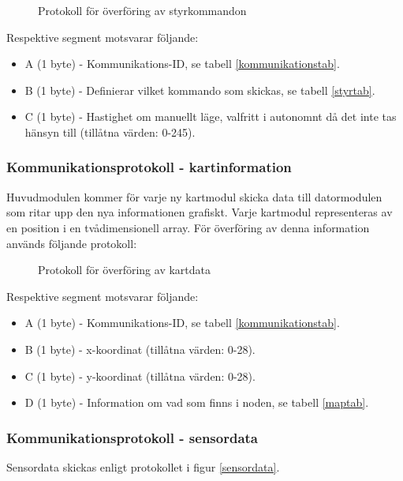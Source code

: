 \documentclass[11pt]{article}
\begin{document}
\begin{flushleft}
\begin{figure}[htbp]
\centering
\noindent\resizebox{.8\linewidth}{!}{
	}
	\caption{Protokoll för överföring av styrkommandon\label{styrdata}}	
\end{figure}

Respektive segment motsvarar följande: 
\begin{itemize}
	\item A (1 byte) - Kommunikations-ID, se tabell \ref{kommunikationstab}.
	\item B (1 byte) - Definierar vilket kommando som skickas, se tabell \ref{styrtab}.
	\item C (1 byte) - Hastighet om manuellt läge, valfritt i autonomnt då det inte tas hänsyn till (tillåtna värden: 0-245).
\end{itemize}

\subsubsection{Kommunikationsprotokoll - kartinformation}
Huvudmodulen kommer för varje ny kartmodul skicka data till datormodulen som ritar upp den nya informationen grafiskt. Varje kartmodul representeras av en position i en tvådimensionell array. För överföring av denna information används följande protokoll:

 \begin{figure}[H]
\centering
\noindent\resizebox{.8\linewidth}{!}{
	}
	\caption{Protokoll för överföring av kartdata \label{kartdata}}	
\end{figure} 

Respektive segment motsvarar följande: 
\begin{itemize}
	\item A (1 byte) - Kommunikations-ID, se tabell \ref{kommunikationstab}.
	\item B (1 byte) - x-koordinat (tillåtna värden: 0-28).
	\item C (1 byte) - y-koordinat (tillåtna värden: 0-28).
	\item D (1 byte) - Information om vad som finns i noden, se tabell \ref{maptab}.
\end{itemize}

\subsubsection{Kommunikationsprotokoll - sensordata}
Sensordata skickas enligt protokollet i figur \ref{sensordata}.


\end{flushleft}
\end{document}
